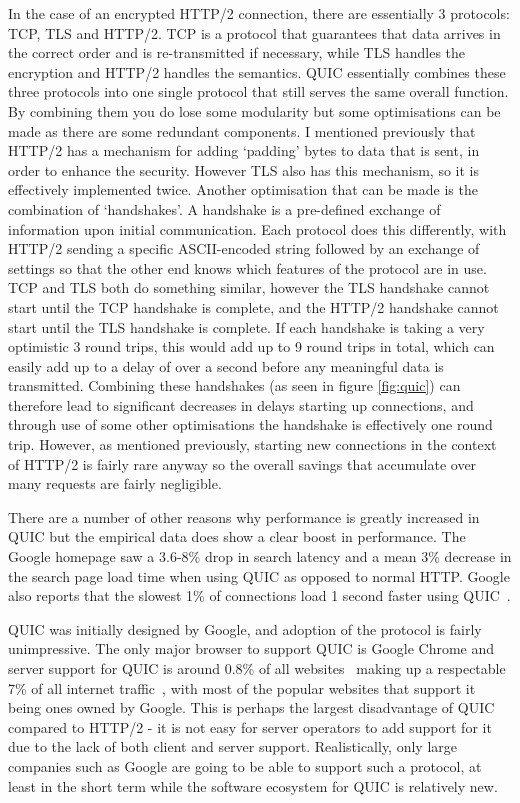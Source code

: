 In the case of an encrypted HTTP/2 connection, there are essentially 3 protocols: TCP, TLS and HTTP/2. TCP is a protocol that guarantees that data arrives in the correct order and is re-transmitted if necessary, while TLS handles the encryption and HTTP/2 handles the semantics. QUIC essentially combines these three protocols into one single protocol that still serves the same overall function. By combining them you do lose some modularity but some optimisations can be made as there are some redundant components. I mentioned previously that HTTP/2 has a mechanism for adding `padding' bytes to data that is sent, in order to enhance the security. However TLS also has this mechanism, so it is effectively implemented twice. Another optimisation that can be made is the combination of `handshakes'. A handshake is a pre-defined exchange of information upon initial communication. Each protocol does this differently, with HTTP/2 sending a specific ASCII-encoded string followed by an exchange of settings so that the other end knows which features of the protocol are in use. TCP and TLS both do something similar, however the TLS handshake cannot start until the TCP handshake is complete, and the HTTP/2 handshake cannot start until the TLS handshake is complete. If each handshake is taking a very optimistic 3 round trips, this would add up to 9 round trips in total, which can easily add up to a delay of over a second before any meaningful data is transmitted. Combining these handshakes (as seen in figure \ref{fig:quic}) can therefore lead to significant decreases in delays starting up connections, and through use of some other optimisations the handshake is effectively one round trip. However, as mentioned previously, starting new connections in the context of HTTP/2 is fairly rare anyway so the overall savings that accumulate over many requests are fairly negligible.

There are a number of other reasons why performance is greatly increased in QUIC but the empirical data does show a clear boost in performance. The Google homepage saw a 3.6-8\% drop in search latency and a mean 3\% decrease in the search page load time when using QUIC as opposed to normal HTTP. Google also reports that the slowest 1\% of connections load 1 second faster using QUIC~\cite{quic-look}.

QUIC was initially designed by Google, and adoption of the protocol is fairly unimpressive. The only major browser to support QUIC is Google Chrome and server support for QUIC is around 0.8\% of all websites~\cite{quic-report} making up a respectable 7\% of all internet traffic~\cite{quic-lwn}, with most of the popular websites that support it being ones owned by Google. This is perhaps the largest disadvantage of QUIC compared to HTTP/2 - it is not easy for server operators to add support for it due to the lack of both client and server support. Realistically, only large companies such as Google are going to be able to support such a protocol, at least in the short term while the software ecosystem for QUIC is relatively new.

